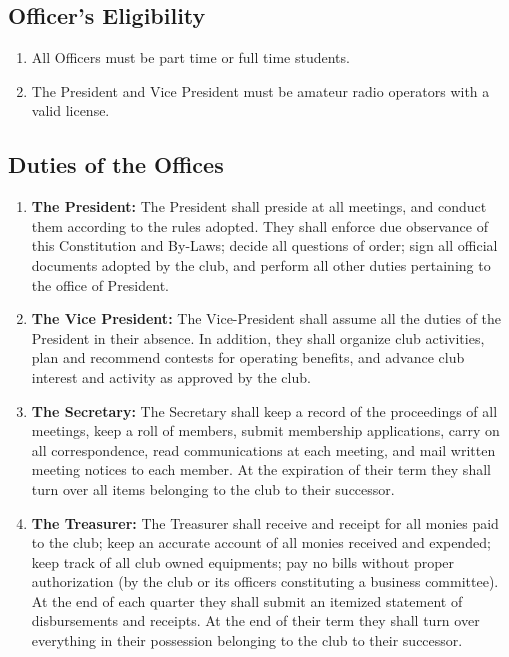 \documentclass[a4paper,12pt]{article}
\begin{document}
\subsection{Officer's Eligibility}
\begin{enumerate}
  \item All Officers must be part time or full time students.
  \item The President and Vice President must be amateur radio operators with a valid license.
\end{enumerate}

\subsection{Duties of the Offices}
\begin{enumerate}
  \item \textbf{The President:} The President shall preside at all meetings, and conduct them according to the rules adopted. They shall enforce due observance of this Constitution and By-Laws; decide all questions of order; sign all official documents adopted by the club, and perform all other duties pertaining to the office of President.
  \item \textbf{The Vice President:} The Vice-President shall assume all the duties of the President in their absence. In addition, they shall organize club activities, plan and recommend contests for operating benefits, and advance club interest and activity as approved by the club.
  \item \textbf{The Secretary:} The Secretary shall keep a record of the proceedings of all meetings, keep a roll of members, submit
membership applications, carry on all correspondence, read communications at each meeting, and
mail written meeting notices to each member. At the expiration of their term they shall turn over
all items belonging to the club to their successor.
  \item \textbf{The Treasurer:} The Treasurer shall receive and receipt for all monies paid to the club;
  keep an accurate account of all monies received and expended;
  keep track of all club owned equipments;
  pay no bills without proper authorization (by the club or its officers constituting a business committee). At the end of each quarter they shall submit an itemized statement of disbursements and receipts. At the end of their term they shall turn over everything in their possession belonging to the club to their successor.
\end{enumerate}
\end{document}
